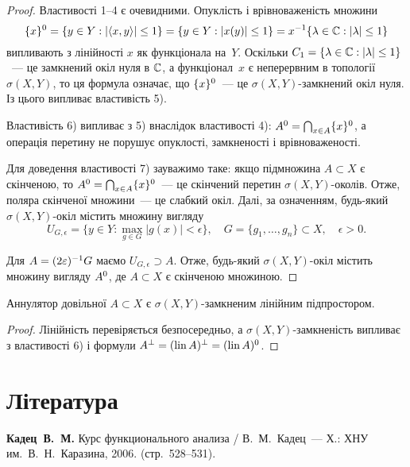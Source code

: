 \begin{proof}
    Властивості 1--4 є очевидними. Опуклість і
    врівноваженість множини
    \begin{equation*}
        \{x\}^0 = \{y \in Y: |\langle x, y \rangle| \le 1\} = \{y \in Y: |x(y)| \le 1 \} = x^{-1} \{\lambda \in \mathbb{C}: |\lambda| \le 1\}
    \end{equation*}
    випливають з лінійності $x$ як функціонала на~$Y$. Оскільки $C_1 = \{ \lambda \in \mathbb{C}: |\lambda| \le 1\}$~--- це замкнений окіл нуля в $\mathbb{C}$, а функціонал~$x$ є неперервним в топології~$\sigma(X, Y)$, то ця формула означає, що $\{x\}^0$~--- це $\sigma(X, Y)$-замкнений окіл нуля. Із цього випливає властивість 5).
    
    Властивість 6) випливає з 5) внаслідок властивості 4): $A^0 = \bigcap_{x \in A} \{x\}^0$, а операція перетину не порушує опуклості, замкненості і
    врівноваженості.
    
    Для доведення властивості 7) зауважимо таке: якщо підмножина $A \subset X$ є скінченою, то $A^0 = \bigcap_{x \in A} \{x\}^0$~--- це скінчений перетин $\sigma(X, Y)$-околів. Отже, поляра скінченої множини~--- це слабкий окіл. Далі, за означенням, будь-який $\sigma(X, Y)$-окіл містить множину вигляду
    \begin{equation*}
        U_{G, \epsilon} = \{ y \in Y: \max_{g \in G} |g(x)| < \epsilon\}, \quad G = \{g_1, \dots, g_n\} \subset X, \quad \epsilon > 0.
    \end{equation*}

    Для $A = (2 \varepsilon)^{-1} G$ маємо $U_{G, \epsilon} \supset A$. Отже, будь-який $\sigma(X, Y)$-окіл містить множину вигляду $A^0$, де $A \subset X$ є скінченою множиною.
\end{proof}

\begin{corollary}
    Аннулятор довільної $A \subset X$ є $\sigma(X, Y)$-замкненим лінійним підпростором.
\end{corollary}

\begin{proof}
    Лінійність перевіряється безпосередньо, а $\sigma(X, Y)$-замкненість випливає з властивості 6) і формули $A^\perp = (\operatorname{lin} A)^\perp = (\operatorname{lin} A)^0$.
\end{proof}

\section{Література}

\begin{enumerate}[label={[\arabic*]}]
\item \textbf{Кадец~В.~М.}
Курс функционального анализа /
В.~М.~Кадец~---
Х.: ХНУ им.~В.~Н.~Каразина, 2006. (стр.~528--531).
\end{enumerate}
